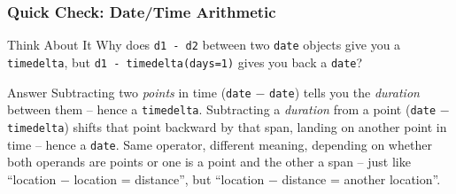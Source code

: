 \begin{frame}[fragile]\frametitle{Quick Check: Date/Time Arithmetic}
\begin{block}{Think About It}
Why does \lstinline|d1 - d2| between two \texttt{date} objects give you a \texttt{timedelta},
but \lstinline|d1 - timedelta(days=1)| gives you back a \texttt{date}?
\end{block}
\pause
\begin{block}{Answer}
Subtracting two \emph{points} in time (\texttt{date} $-$ \texttt{date}) tells you the
\emph{duration} between them -- hence a \texttt{timedelta}. Subtracting a \emph{duration} from a
point (\texttt{date} $-$ \texttt{timedelta}) shifts that point backward by that span, landing on
another point in time -- hence a \texttt{date}. Same operator, different meaning, depending on
whether both operands are points or one is a point and the other a span -- just like
``location $-$ location = distance'', but ``location $-$ distance = another location''.
\end{block}
\end{frame}




